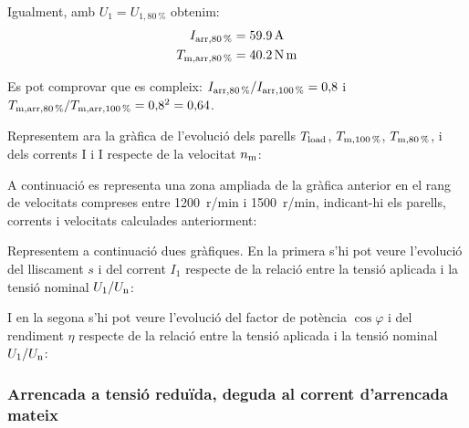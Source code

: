 \begin{exemple}
	Igualment, amb $U_1 = U_{1,\qty{80}{\%}}$ obtenim:
	\vspace{-2mm}
	\begin{align*}
		I_\mathrm{arr,\qty{80}{\%}} &=  \qty{59,9}{A} \\
		T_\mathrm{m,arr,\qty{80}{\%}} &=  \qty{40,2}{N.m} 
	\end{align*}
	
	Es pot comprovar que es compleix: $I_\mathrm{arr,\qty{80}{\%}} / I_\mathrm{arr,\qty{100}{\%}} = 0{,}8$ i $T_\mathrm{m,arr,\qty{80}{\%}} / T_\mathrm{m,arr,\qty{100}{\%}} = 0{,}8^2 = 0{,}64$.
		
 	Representem ara la gràfica de l'evolució dels parells $T_\mathrm{load}$,  $T_\mathrm{m,\qty{100}{\%}}$,  $T_\mathrm{m,\qty{80}{\%}}$, i dels	corrents I i I respecte de la velocitat $n_\mathrm{m}$:	
    \begin{center}
		\fontsize{10pt}{11pt}\selectfont
		
	\end{center}	

	\vspace{-2mm}
	A continuació es representa una zona ampliada de la gràfica anterior en el rang de velocitats compreses entre \qty{1200}{r/min} i  \qty{1500}{r/min}, indicant-hi els parells, corrents i velocitats calculades anteriorment:

	\begin{center}
		\fontsize{10pt}{11pt}\selectfont
		
	\end{center}

	Representem a continuació dues gràfiques. En la primera s'hi pot veure  l'evolució del lliscament $s$ i del corrent $I_1$ respecte de la relació entre la tensió aplicada i la tensió nominal $U_1/U_\mathrm{n}$:
	\begin{center}
		
	\end{center}
	
	I en la segona s'hi pot veure l'evolució del factor de potència $\cos\varphi$ i del rendiment $\eta$ respecte de la relació entre la tensió aplicada i la tensió nominal $U_1/U_\mathrm{n}$:
	\begin{center}
		
	\end{center}
\end{exemple} 


\subsubsection{Arrencada a tensió reduïda, deguda al  corrent d'arrencada mateix}

